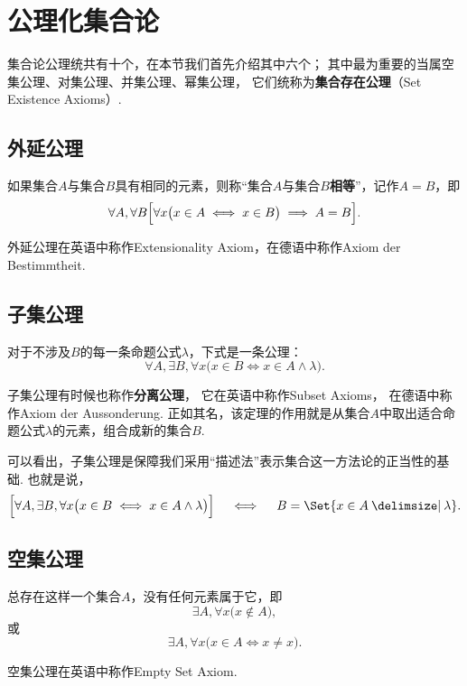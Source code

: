 \section{公理化集合论}
集合论公理统共有十个，在本节我们首先介绍其中六个；
其中最为重要的当属空集公理、对集公理、并集公理、幂集公理，%
它们统称为\textbf{集合存在公理}（Set Existence Axioms）.

\subsection{外延公理}
\begin{axiom}[外延公理]
如果集合\(A\)与集合\(B\)具有相同的元素，则称“集合\(A\)与集合\(B\)\textbf{相等}”，记作\(A=B\)，即\[
\forall A, \forall B \Bigl[
	\forall x \bigl( x \in A \iff x \in B \bigr)
	\implies A = B
\Bigr].
\]
\end{axiom}
外延公理在英语中称作Extensionality Axiom，在德语中称作Axiom der Bestimmtheit.

\subsection{子集公理}
\begin{axiom}[子集公理]
对于不涉及\(B\)的每一条命题公式\(\lambda\)，下式是一条公理：\[
\forall A, \exists B, \forall x \bigl(
	x \in B \iff x \in A \land \lambda
\bigr).
\]
\end{axiom}
子集公理有时候也称作\textbf{分离公理}，%
它在英语中称作Subset Axioms，%
在德语中称作Axiom der Aussonderung.
正如其名，该定理的作用就是从集合\(A\)中取出适合命题公式\(\lambda\)的元素，组合成新的集合\(B\).

可以看出，子集公理是保障我们采用“描述法”表示集合这一方法论的正当性的基础.
也就是说，\[
\Bigl[
	\forall A, \exists B, \forall x \bigl(
		x \in B \iff x \in A \land \lambda
	\bigr)
\Bigr]
\quad\iff\quad
B = \Set{ x \in A \given \lambda }.
\]

\subsection{空集公理}
\begin{axiom}[空集公理]
总存在这样一个集合\(A\)，没有任何元素属于它，即\[
\exists A, \forall x \bigl( x \notin A \bigr),
\]或\[
\exists A, \forall x \bigl( x \in A \iff x \neq x \bigr).
\]
\end{axiom}
空集公理在英语中称作Empty Set Axiom.

